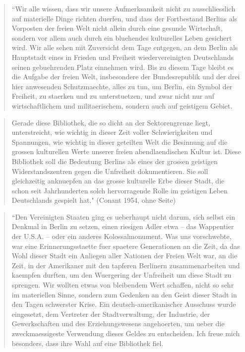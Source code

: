 \documentclass[a4paper,
fontsize=11pt,
oneside,
numbers=noperiodatend,
parskip=half-,
bibliography=totoc,
final
]{scrartcl}
\begin{document}
\begin{quote}
``Wir alle wissen, dass wir unsere Aufmerksamkeit nicht zu
ausschliesslich auf materielle Dinge richten duerfen, und dass der
Fortbestand Berlins als Vorposten der freien Welt nicht allein durch
eine gesunde Wirtschaft, sondern vor allem auch durch ein bluehendes
kulturelles Leben gesichert wird. Wir alle sehen mit Zuversicht dem Tage
entgegen, an dem Berlin als Hauptstadt eines in Frieden und Freiheit
wiedervereinigten Deutschlands seinen gebuehrenden Platz einnehmen wird.
Bis zu diesem Tage bleibt es die Aufgabe der freien Welt, insbesondere
der Bundesrepublik und der drei hier anwesenden Schutzmaechte, alles zu
tun, um Berlin, ein Symbol der Freiheit, zu staerken und zu
unterstuetzen, und zwar nicht nur auf wirtschaftlichem und
militaerischem, sondern auch auf geistigem Gebiet.
\end{quote}

\begin{quote}
Gerade diese Bibliothek, die so dicht an der Sektorengrenze liegt,
unterstreicht, wie wichtig in dieser Zeit voller Schwierigkeiten und
Spannungen, wie wichtig in dieser geteilten Welt die Besinnung auf die
grossen kulturellen Werte unserer freien abendlaendischen Kultur ist.
Diese Bibliothek soll die Bedeutung Berlins als eines der grossen
geistigen Widerstandszentren gegen die Unfreiheit dokumentieren. Sie
soll gleichzeitig anknuepfen an das grosse kulturelle Erbe dieser Stadt,
die schon seit Jahrhunderten solch hervorragende Rolle im geistigen
Leben Deutschlands gespielt hat." (Conant 1954, ohne Seite)
\end{quote}

\begin{quote}
``Den Vereinigten Staaten ging es ueberhaupt nicht darum, sich selbst
ein Denkmal in Berlin zu setzen, einen riesigen Adler etwa -- das
Wappentier der U.S.A. -- oder ein anderes Kolossalmonument. Was uns
vorschwebte, war eine Erinnerungsstaette fuer spaetere Generationen an
die Zeit, da das Wohl dieser Stadt ein Anliegen aller Nationen der
Freien Welt war, an die Zeit, in der Amerikaner mit den tapferen
Berlinern zusammenarbeiten und kaempfen durften, um den Wuergering der
Unfreiheit um diese Stadt zu sprengen. Wir wollten etwas von bleibendem
Wert schaffen, nicht so sehr im materiellen Sinne, sondern zum Gedenken
an den Geist dieser Stadt in den Tagen schwerster Krise. Ein
deutsch-amerikanischer Ausschuss wurde eingesetzt, dem Vertreter der
Stadtverwaltung, der Industrie, der Gewerkschaften und des
Erziehungswesens angehoerten, um ueber die zweckmaessigeste Verwendung
dieses Geldes zu entscheiden. Ich freue mich besonders, dass ihre Wahl
auf eine Bibliothek fiel.
\end{quote}
\end{document}
